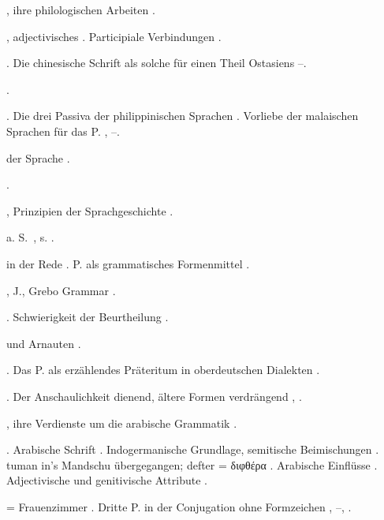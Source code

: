 \begin{register}
, ihre philologischen Arbeiten \pageref{sp.22}.


, adjectivisches \pageref{sp.101}. Participiale Verbindungen \pageref{sp.465}.

. Die chinesische Schrift als solche für einen Theil Ostasiens \pageref{sp.129}–\pageref{sp.130}.

 \pageref{sp.253}.

 \pageref{sp.102}. Die drei Passiva der philippinischen Sprachen \pageref{sp.363}. Vorliebe der malaischen Sprachen für das P. \pageref{sp.415}, \pageref{sp.419}–\pageref{sp.420}.

 der Sprache \pageref{sp.17}.

 \pageref{sp.126}.

, Prinzipien der Sprachgeschichte \pageref{sp.136}.

 a. S.~, s. .

 in der Rede \pageref{sp.225}. P. als grammatisches Formenmittel \pageref{sp.451}.

, J., Grebo Grammar \pageref{sp.379}.

 \sed{\pageref{sp.269}, \pageref{sp.273}}. Schwierigkeit der Beurtheilung \pageref{sp.426}.

 und Arnauten \pageref{sp.146}.


 \pageref{sp.103}. Das P. als erzählendes Präteritum in oberdeutschen Dialekten \pageref{sp.253}.

 \pageref{sp.183}. Der Anschaulichkeit dienend, ältere Formen verdrängend \pageref{sp.241}, \pageref{sp.256}.

, ihre Verdienste um die arabische Grammatik \pageref{sp.22}.

. Arabische Schrift \pageref{sp.129}. Indogermanische Grundlage, semitische Beimischungen \pageref{sp.158}. tuman in’s Mandschu übergegangen; defter = διφθέρα \pageref{sp.264}. Arabische Einflüsse \pageref{sp.271}. Adjectivische und genitivische Attribute \pageref{sp.457}.


 = Frauenzimmer \pageref{sp.235}. Dritte P. in der Conjugation ohne Formzeichen \pageref{sp.383}, \pageref{sp.391}–\pageref{sp.392}, \pageref{sp.460}.


\end{register}
